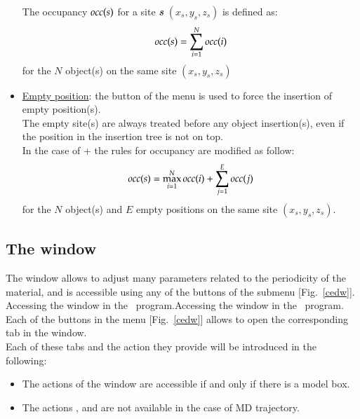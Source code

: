 \begin{itemize}
\begin{center}\end{center}
The occupancy $occ({\bf{\textit{s}}})$ for a site {\bf{\textit{s}}} $(x_s, y_s, z_s)$ is defined as: 
\begin{equation}occ({\bf{\textit{s}}}) = \sum_{i=1}^{N} occ(i)
\end{equation}
for the $N$ object(s) on the same site $(x_s, y_s, z_s)$
\item \uline{Empty position}: 
the  button of the  menu is used to force the insertion of empty position(s). \\
The empty site(s) are always treated before any object insertion(s), even if the position in the insertion tree is not on top. \\
In the case of + the rules for occupancy are modified as follow: \\
\begin{equation}
occ({\bf{\textit{s}}}) = \max_{i=1}^{N} occ(i) + \sum_{j=1}^{E} occ(j) \\[0.25cm]
\end{equation}
for the $N$ object(s) and $E$ empty positions on the same site $(x_s, y_s, z_s)$.
\end{itemize}

\subsection{The  window}

The  window allows to adjust many parameters related to the periodicity of the material, 
and is accessible using any of the buttons of the  submenu [Fig.~\ref{cedw}]. \\
{Accessing the  window in the \atomes\ program.}{Accessing the  window in the \atomes\ program.}
\laf Each of the buttons in the  menu [Fig.~\ref{cedw}] allows to open the corresponding tab in the  window. \\
Each of these tabs and the action they provide will be introduced in the following: 
\begin{itemize}
\item The actions of the  window are accessible if and only if there is a model box. 
\item The actions ,  and  are not available in the case of MD trajectory.
\end{itemize}
\newpage
